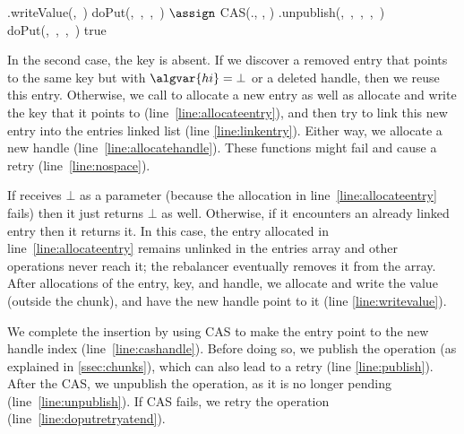 \begin{algorithm}[htb]
\begin{algorithmic}
\EndIf 
\State {}.writeValue(,\ \givenvalue) \label{line:writevalue}
\State \Return doPut(\key,\ \givenvalue,\ ,\ )
\EndIf \label{line:publish}
\State {} $\assign$ CAS(., , ) \label{line:cashandle}
\State {}.unpublish(,\ ,\ ,\ ,\ ) \label{line:unpublish}
 \label{line:retryaftercas} 
\State \Return doPut(\key,\ \givenvalue,\ ,\ ) \label{line:doputretryatend}
\EndIf
\State \Return true \label{line:doput return}
\EndProcedure
{}
\end{algorithmic}
\end{algorithm}



In the second case, the key is absent.
If we discover a removed entry that points to the same key but with $\algvar{hi} = \bot$ or a deleted handle, then we reuse this entry. 
Otherwise, we call  to allocate a new entry as well as allocate and write the key that it points to (line~\ref{line:allocateentry}), and 
then  try to link this new entry into the entries linked list  (line \ref{line:linkentry}).
Either way, we allocate a new handle (line~\ref{line:allocatehandle}).
These functions might fail and cause a retry (line~\ref{line:nospace}).

If  receives $\bot$ as a parameter (because the allocation in line~\ref{line:allocateentry} fails) then it just returns $\bot$ as well. 
Otherwise, if it encounters an already linked entry then it returns it.
In this case, the entry allocated in line~\ref{line:allocateentry} remains unlinked in the entries array and other operations never reach it; the rebalancer eventually removes it from the array.
After allocations of the entry, key, and handle, we allocate and write the value (outside the chunk), and have the new handle point to it (line \ref{line:writevalue}).

We complete the insertion by using CAS to make the entry point to the new handle index (line~\ref{line:cashandle}). 
Before doing so, we publish the operation (as explained in \cref{ssec:chunks}), 
which can also lead to a retry (line \ref{line:publish}).
After the CAS, we unpublish the operation, as it is no longer pending (line~\ref{line:unpublish}). 
If CAS fails, we retry the operation (line~\ref{line:doputretryatend}). 

